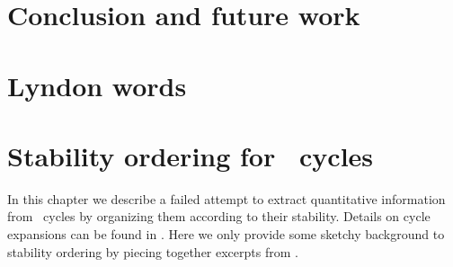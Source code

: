 \chapter{Conclusion and future work}
   \label{chap:tobedone}
   
   



\appendix

\chapter{Lyndon words}


\chapter{Stability ordering for \KS\ cycles}
\label{chap:POT} 	
In this chapter we describe a failed attempt to extract
quantitative information from \KSe\ cycles by
organizing them according to their stability.
Details on cycle expansions can be found in .
Here we only provide some sketchy background to stability ordering
by piecing together excerpts from .
	
